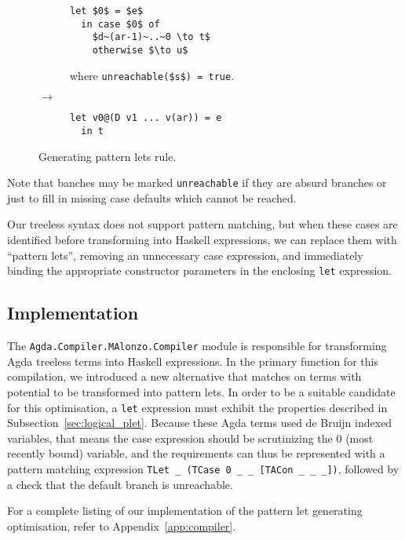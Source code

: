 \begin{figure}[h]
\centering
\begin{subfigure}{.47\textwidth}
  \begin{lstlisting}[style=math]
  let $0$ = $e$
  in case $0$ of
    $d~(ar-1)~..~0 \to t$
    otherwise $\to u$
  \end{lstlisting}
  where \lstinline[style=math]{unreachable($s$) = true}.
\end{subfigure}
{\large$\to$}
\begin{subfigure}{.47\textwidth}
  \begin{lstlisting}[style=blockhaskell]
  let v0@(D v1 ... v(ar)) = e
  in t
  \end{lstlisting}
\end{subfigure}
\caption{Generating pattern lets rule.}
\label{fig:plet_rule}
\end{figure}

Note that banches may be marked \lstinline{unreachable} if they are absurd branches or just to fill in missing case defaults which cannot be reached.

Our treeless syntax does not support pattern matching, but when these cases are identified before transforming into Haskell expressions, we can replace them with ``pattern lets'', removing an unnecessary case expression, and immediately binding the appropriate constructor parameters in the enclosing \lstinline{let} expression.

\subsection{Implementation}

The \lstinline{Agda.Compiler.MAlonzo.Compiler} module is responsible for transforming Agda treeless terms into Haskell expressions. In the primary function for this compilation, we introduced a new alternative that matches on terms with potential to be transformed into pattern lets. In order to be a suitable candidate for this optimisation, a \lstinline{let} expression must exhibit the properties described in Subsection~\ref{sec:logical_plet}. Because these Agda terms used de Bruijn indexed variables, that means the case expression should be scrutinizing the 0 (most recently bound) variable, and the requirements can thus be represented with a pattern matching expression \lstinline{TLet _ (TCase 0 _ _ [TACon _ _ _])}, followed by a check that the default branch is unreachable.

For a complete listing of our implementation of the pattern let generating optimisation, refer to Appendix~\ref{app:compiler}.

